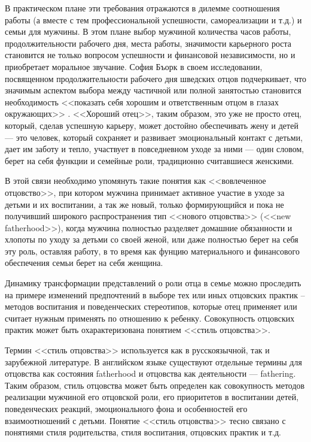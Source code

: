 \documentclass{../../common/thesisbyxetex}
\begin{document}
В практическом плане эти требования отражаются в дилемме соотношения работы (а вместе с тем
профессиональной успешности, самореализации и т.д.) и семьи для мужчины.
В этом плане выбор мужчиной количества часов работы,
продолжительности рабочего дня, места работы, значимости карьерного роста становится не только
вопросом успешности и финансовой независимости,
но и приобретает моральное звучание. София Бъорк в своем исследовании, посвященном
продолжительности рабочего дня шведских отцов подчеркивает, что значимым аспектом  выбора
между частичной или полной занятостью становится необходимость <<показать себя хорошим и
ответственным отцом в глазах окружающих>> \cite[221]{morfat}. <<Хороший отец>>, таким образом, это
уже не просто отец, который, сделав успешную карьеру, может достойно обеспечивать жену и детей ---
это человек, который сохраняет и развивает эмоциональный контакт с детьми, дает им заботу и тепло,
участвует в повседневном уходе за ними --- один словом, берет на себя функции и семейные роли,
традиционно считавшиеся женскими.

В этой связи необходимо упомянуть такие понятия как <<вовлеченное отцовство>>,
при котором мужчина принимает активное участие в уходе за детьми и их воспитании, а так же
новый,  только формирующийся и пока не получивший широкого распространения  тип <<нового
отцовства>> (<<new fatherhood>>), когда мужчина полностью разделяет домашние обязанности и хлопоты
по уходу за детьми со своей женой, или даже полностью берет на себя эту роль, оставляя работу, в то
время как фунцию материального и финансового обеспечения семьи берет на себя женщина.

Динамику трансформации представлений о роли отца в семье можно проследить на примере изменений
предпочтений в выборе тех или иных отцовских практик -- методов воспитания и поведенческих
стереотипов, которые отец применяет или считает нужным применять по отношению к ребенку.
Совокупность отцовских практик может быть охарактеризована понятием <<стиль отцовства>>.

Термин <<стиль отцовства>> используется как в русскоязычной, так и зарубежной литературе. В
английском языке существуют  отдельные термины для отцовства как
состояния fatherhood и  отцовства как деятельности  --- fathering. Таким образом, стиль отцовства
может быть определен как совокупность методов реализации мужчиной
его отцовской роли, его приоритетов в воспитании детей, поведенческих реакций, эмоционального фона
и особенностей его взаимоотношений с детьми.
Понятие <<стиль отцовства>> тесно связано с понятиями стиля родительства, стиля
воспитания, отцовских практик  и т.д.
\end{document}
